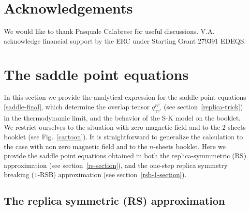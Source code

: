 \documentclass[twocolumn,superscriptaddress,prb,10pt]{revtex4-1}
\begin{document}
\section{Acknowledgements}
We would like to thank Pasquale Calabrese for useful discussions. V.A.  acknowledge 
financial support by the ERC under Starting Grant 279391 EDEQS. 




\appendix

\section{The saddle point equations} 
\label{saddle-equations}

In this section we provide the analytical expression for the saddle point equations 
\eqref{saddle-final}, which determine the overlap tensor $q_{\gamma\gamma'}^{rr'}$ 
(see section~\ref{replica-trick}) in the thermodynamic limit, and the behavior of the 
S-K model on the booklet. We restrict ourselves to the situation with zero magnetic 
field and to the $2$-sheets booklet (see Fig.~\ref{cartoon}). It is straightforward 
to generalize the calculation to the case with non zero magnetic field and to the 
$n$-sheets booklet. Here we provide the saddle point equations obtained in both the 
replica-symmmetric (RS) approximation (see section~\ref{rs-section}), and the 
one-step replica symmetry breaking ($1$-RSB) approximation (see 
section~\ref{rsb-1-section}). 

\subsection{The replica symmetric (RS) approximation}
\end{document}

